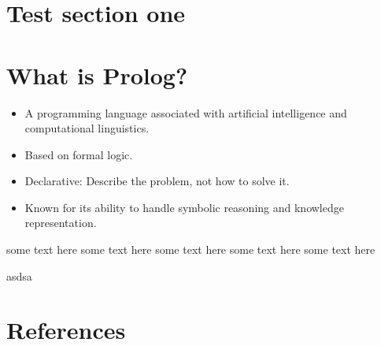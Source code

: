 \documentclass[twocolumn,landscape]{book}
\begin{document}
\section{Test section one}

\section{What is Prolog?}
\begin{itemize}
    \item A programming language associated with artificial intelligence and computational linguistics.
    \item Based on formal logic.
    \item Declarative: Describe the problem, not how to solve it.
    \item Known for its ability to handle symbolic reasoning and knowledge representation.
\end{itemize}


   some text here some text here some text here some text here some text here
    \begin{center}
       asdsa
     \end{center}

\section{References}
         
         
\end{document}
